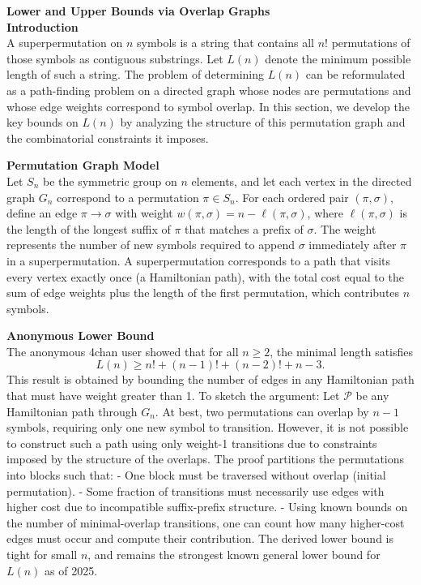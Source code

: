 \begin{technical}
{\Large\textbf{Lower and Upper Bounds via Overlap Graphs}}\\

\noindent\textbf{Introduction}\\
A superpermutation on $n$ symbols is a string that contains all $n!$ permutations of those symbols as contiguous substrings. Let $L(n)$ denote the minimum possible length of such a string. The problem of determining $L(n)$ can be reformulated as a path-finding problem on a directed graph whose nodes are permutations and whose edge weights correspond to symbol overlap. In this section, we develop the key bounds on $L(n)$ by analyzing the structure of this permutation graph and the combinatorial constraints it imposes.

\noindent\textbf{Permutation Graph Model}\\
Let $S_n$ be the symmetric group on $n$ elements, and let each vertex in the directed graph $G_n$ correspond to a permutation $\pi \in S_n$. For each ordered pair $(\pi, \sigma)$, define an edge $\pi \rightarrow \sigma$ with weight $w(\pi, \sigma) = n - \ell(\pi, \sigma)$, where $\ell(\pi, \sigma)$ is the length of the longest suffix of $\pi$ that matches a prefix of $\sigma$. The weight represents the number of new symbols required to append $\sigma$ immediately after $\pi$ in a superpermutation. A superpermutation corresponds to a path that visits every vertex exactly once (a Hamiltonian path), with the total cost equal to the sum of edge weights plus the length of the first permutation, which contributes $n$ symbols.

\noindent\textbf{Anonymous Lower Bound}\\
The anonymous 4chan user showed that for all $n \geq 2$, the minimal length satisfies
\[
L(n) \geq n! + (n-1)! + (n-2)! + n - 3.
\]
This result is obtained by bounding the number of edges in any Hamiltonian path that must have weight greater than 1. To sketch the argument: Let $\mathcal{P}$ be any Hamiltonian path through $G_n$. At best, two permutations can overlap by $n-1$ symbols, requiring only one new symbol to transition. However, it is not possible to construct such a path using only weight-1 transitions due to constraints imposed by the structure of the overlaps. The proof partitions the permutations into blocks such that:
- One block must be traversed without overlap (initial permutation).
- Some fraction of transitions must necessarily use edges with higher cost due to incompatible suffix-prefix structure.
- Using known bounds on the number of minimal-overlap transitions, one can count how many higher-cost edges must occur and compute their contribution.
The derived lower bound is tight for small $n$, and remains the strongest known general lower bound for $L(n)$ as of 2025.


\end{technical}

